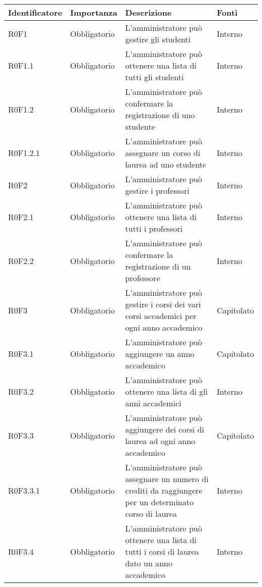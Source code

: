 \documentclass[AnalisiDeiRequisiti.tex]{subfiles}
\begin{document}
\label{table:Tabella requisiti funzionali}
\begin{longtable}[H]{|p{2.5cm}|p{2.5cm}|p{5cm}|p{2cm}|}
	\hline
	\rowcolor[HTML]{38FFF8} 
	\textbf{Identificatore} & \textbf{Importanza} & \textbf{Descrizione} & \textbf{Fonti} \\ \hline
	\endhead
	R0F1 & Obbligatorio & L'amministratore può gestire gli studenti & Interno \\ \hline
	R0F1.1 & Obbligatorio & L'amministratore può ottenere una lista di tutti gli studenti & Interno \\ \hline
	R0F1.2 & Obbligatorio & L'amministratore può confermare la registrazione di uno studente & Interno \\ \hline
	R0F1.2.1 & Obbligatorio & L'amministratore può assegnare un corso di laurea ad uno studente & Interno \\ \hline
	R0F2 & Obbligatorio & L'amministratore può gestire i professori & Interno \\ \hline
	R0F2.1 & Obbligatorio & L'amministratore può ottenere una lista di tutti i professori & Interno \\ \hline
	R0F2.2 & Obbligatorio & L'amministratore può confermare la registrazione di un professore & Interno \\ \hline
	R0F3 & Obbligatorio & L'amministratore può gestire i corsi dei vari corsi accademici per ogni anno accademico & Capitolato \\ \hline %
	R0F3.1 & Obbligatorio & L'amministratore può aggiungere un anno accademico & Capitolato \\ \hline
	R0F3.2 & Obbligatorio & L'amministratore può ottenere una lista di gli anni accademici & Interno \\ \hline
	R0F3.3 & Obbligatorio & L'amministratore può aggiungere dei corsi di laurea ad ogni anno accademico & Capitolato \\ \hline
	R0F3.3.1 & Obbligatorio & L'amministratore può assegnare un numero di crediti da raggiungere per un determinato corso di laurea & Interno \\ \hline
	R0F3.4 & Obbligatorio & L'amministratore può ottenere una lista di tutti i corsi di laurea dato un anno accademico & Interno \\ \hline

\end{longtable}
\end{document}
